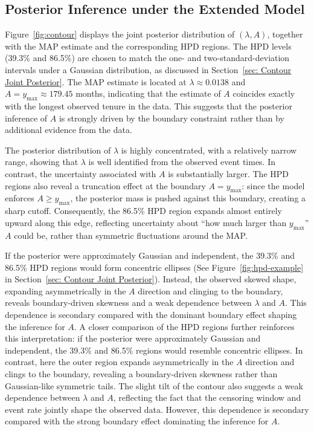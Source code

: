 \subsection{Posterior Inference under the Extended Model}
\label{res:post_contour}
Figure~\ref{fig:contour} displays the joint posterior distribution of $(\lambda, A)$, together with the MAP estimate and the corresponding HPD regions. The HPD levels (39.3\% and 86.5\%) are chosen to match the one- and two-standard-deviation intervals under a Gaussian distribution, as discussed in Section~\ref{sec: Contour Joint Posterior}. The MAP estimate is located at $\lambda \approx 0.0138$ and $A = y_{\max} \approx 179.45$ months, indicating that the estimate of $A$ coincides exactly with the longest observed tenure in the data. This suggests that the posterior inference of $A$ is strongly driven by the boundary constraint rather than by additional evidence from the data.

The posterior distribution of $\lambda$ is highly concentrated, with a relatively narrow range, showing that $\lambda$ is well identified from the observed event times. In contrast, the uncertainty associated with $A$ is substantially larger. The HPD regions also reveal a truncation effect at the boundary $A = y_{\max}$: since the model enforces $A \geq y_{\max}$, the posterior mass is pushed against this boundary, creating a sharp cutoff. Consequently, the 86.5\% HPD region expands almost entirely upward along this edge, reflecting uncertainty about “how much larger than $y_{\max}$” $A$ could be, rather than symmetric fluctuations around the MAP.

If the posterior were approximately Gaussian and independent, the 39.3\% and 86.5\% HPD regions would form concentric ellipses (See Figure~\ref{fig:hpd-example} in Section~\ref{sec: Contour Joint Posterior}). Instead, the observed skewed shape, expanding asymmetrically in the $A$ direction and clinging to the boundary, reveals boundary-driven skewness and a weak dependence between $\lambda$ and $A$. This dependence is secondary compared with the dominant boundary effect shaping the inference for $A$.
A closer comparison of the HPD regions further reinforces this interpretation: if the posterior were approximately Gaussian and independent, the 39.3\% and 86.5\% regions would resemble concentric ellipses. In contrast, here the outer region expands asymmetrically in the $A$ direction and clings to the boundary, revealing a boundary-driven skewness rather than Gaussian-like symmetric tails. The slight tilt of the contour also suggests a weak dependence between $\lambda$ and $A$, reflecting the fact that the censoring window and event rate jointly shape the observed data. However, this dependence is secondary compared with the strong boundary effect dominating the inference for $A$.


